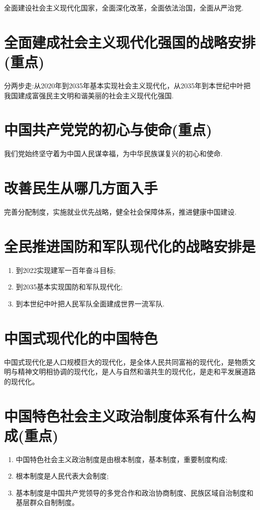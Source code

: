 \documentclass[12pt, a4paper, oneside]{ctexbook}
\begin{document}
全面建设社会主义现代化国家，全面深化改革，全面依法治国，全面从严治党.

\section{全面建成社会主义现代化强国的战略安排(重点)}

分两步走:从2020年到2035年基本实现社会主义现代化，从2035年到本世纪中叶把我国建成富强民主文明和谐美丽的社会主义现代化强国.

\section{中国共产党党的初心与使命(重点)}

我们党始终坚守着为中国人民谋幸福，为中华民族谋复兴的初心和使命.

\section{改善民生从哪几方面入手}

完善分配制度，实施就业优先战略，健全社会保障体系，推进健康中国建设.

\section{全民推进国防和军队现代化的战略安排是}

\begin{enumerate}
\item 到2022实现建军一百年奋斗目标;

\item 到2035基本实现国防和军队现代化;

\item 到本世纪中叶把人民军队全面建成世界一流军队.
\end{enumerate}

\section{中国式现代化的中国特色}

中国式现代化是人口规模巨大的现代化，是全体人民共同富裕的现代化，是物质文明与精神文明相协调的现代化，是人与自然和谐共生的现代化，是走和平发展道路的现代化。

\section{中国特色社会主义政治制度体系有什么构成(重点)}
\begin{enumerate}
\item 中国特色社会主义政治制度是由根本制度，基本制度，重要制度构成;

\item 根本制度是人民代表大会制度;

\item 基本制度是中国共产党领导的多党合作和政治协商制度、民族区域自治制度和基层群众自制制度。
\end{enumerate}
\end{document}
